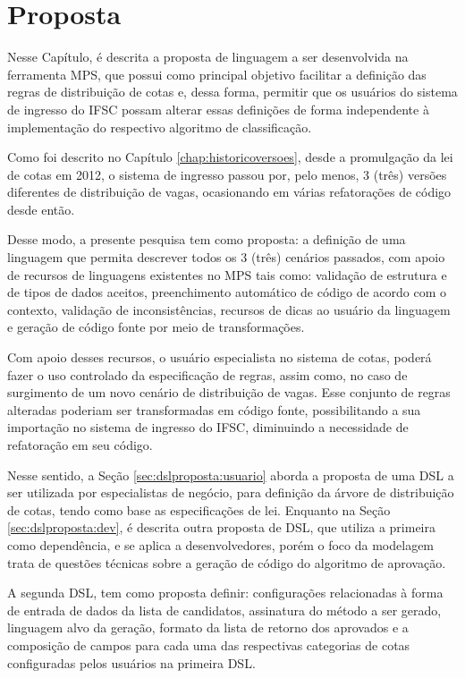\chapter{Proposta}
\label{chap:proposta}

   Nesse Capítulo, é descrita a proposta de linguagem a ser desenvolvida na ferramenta \gls{MPS}, que possui como principal objetivo facilitar a definição das regras de distribuição de cotas e, dessa forma, permitir que os usuários do sistema de ingresso do \gls{IFSC} possam alterar essas definições de forma independente à implementação do respectivo algoritmo de classificação.
   
   Como foi descrito no Capítulo \ref{chap:historicoversoes}, desde a promulgação da lei de cotas em 2012, o sistema de ingresso passou por, pelo menos, 3 (três) versões diferentes de distribuição de vagas, ocasionando em várias refatorações de código desde então. 
   
   Desse modo, a presente pesquisa tem como proposta: a definição de uma linguagem que permita descrever todos os 3 (três) cenários passados, com apoio de recursos de linguagens existentes no \gls{MPS} tais como: validação de estrutura e de tipos de dados aceitos, preenchimento automático de código de acordo com o contexto, validação de inconsistências, recursos de dicas ao usuário da linguagem e geração de código fonte por meio de transformações. 
   
   Com apoio desses recursos, o usuário especialista no sistema de cotas, poderá fazer o uso controlado da especificação de regras, assim como, no caso de surgimento de um novo cenário de distribuição de vagas. Esse conjunto de regras alteradas poderiam ser transformadas em código fonte, possibilitando a  sua importação no sistema de ingresso do \gls{IFSC}, diminuindo a necessidade de refatoração em seu código.
   
   Nesse sentido, a Seção \ref{sec:dslproposta:usuario} aborda a proposta de uma \gls{DSL} a ser utilizada por especialistas de negócio, para definição da árvore de distribuição de cotas, tendo como base as especificações de lei. Enquanto na Seção \ref{sec:dslproposta:dev}, é descrita outra proposta de \gls{DSL}, que utiliza a primeira como dependência, e se aplica a desenvolvedores, porém o foco da modelagem trata de questões técnicas sobre a geração de código do algoritmo de aprovação.
   
   A segunda \gls{DSL}, tem como proposta definir: configurações relacionadas à forma de entrada de dados da lista de candidatos, assinatura do método a ser gerado, linguagem alvo da geração, formato da lista de retorno dos aprovados e a composição de campos para cada uma das respectivas categorias de cotas configuradas pelos usuários na primeira \gls{DSL}.
   
   

   
   
   
   
   
